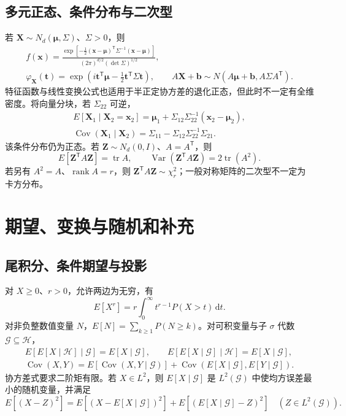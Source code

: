 \documentclass[../main.tex]{subfiles}
\begin{document}
\subsection{多元正态、条件分布与二次型}
若 $\bm X\sim N_d(\bm\mu,\Sigma)$、$\Sigma>0$，则
\begin{gather*}
f(\bm x)=\frac{\exp[-\tfrac12(\bm x-\bm\mu)^{\mathsf T}\Sigma^{-1}(\bm x-\bm\mu)]}
{(2\pi)^{d/2}(\det\Sigma)^{1/2}},\\
\varphi_{\bm X}(\bm t)=\exp(i\bm t^{\mathsf T}\bm\mu-\tfrac12\bm t^{\mathsf T}\Sigma\bm t),\qquad
A\bm X+\bm b\sim N(A\bm\mu+\bm b,A\Sigma A^{\mathsf T}).
\end{gather*}
特征函数与线性变换公式也适用于半正定协方差的退化正态，但此时不一定有全维密度。将向量分块，若 $\Sigma_{22}$ 可逆，
\begin{gather*}
E[\bm X_1\mid\bm X_2=\bm x_2]
=\bm\mu_1+\Sigma_{12}\Sigma_{22}^{-1}(\bm x_2-\bm\mu_2),\\
\operatorname{Cov}(\bm X_1\mid\bm X_2)
=\Sigma_{11}-\Sigma_{12}\Sigma_{22}^{-1}\Sigma_{21}.
\end{gather*}
该条件分布仍为正态。若 $\bm Z\sim N_d(0,I)$、$A=A^{\mathsf T}$，则
\[
E[\bm Z^{\mathsf T}A\bm Z]=\operatorname{tr}A,\qquad
\operatorname{Var}(\bm Z^{\mathsf T}A\bm Z)=2\operatorname{tr}(A^2).
\]
若另有 $A^2=A$、$\operatorname{rank}A=r$，则 $\bm Z^{\mathsf T}A\bm Z\sim\chi_r^2$；一般对称矩阵的二次型不一定为卡方分布。

\section{期望、变换与随机和补充}
\subsection{尾积分、条件期望与投影}
对 $X\ge0$、$r>0$，允许两边为无穷，有
\[
E[X^r]=r\int_0^\infty t^{r-1}P(X>t)\,\mathrm dt.
\]
对非负整数值变量 $N$，$E[N]=\sum_{k\ge1}P(N\ge k)$。对可积变量与子 $\sigma$ 代数 $\mathcal G\subseteq\mathcal H$，
\begin{gather*}
E[E[X\mid\mathcal H]\mid\mathcal G]=E[X\mid\mathcal G],\qquad
E[E[X\mid\mathcal G]\mid\mathcal H]=E[X\mid\mathcal G],\\
\operatorname{Cov}(X,Y)=E[\operatorname{Cov}(X,Y\mid\mathcal G)]
+\operatorname{Cov}(E[X\mid\mathcal G],E[Y\mid\mathcal G]).
\end{gather*}
协方差式要求二阶矩有限。若 $X\in L^2$，则 $E[X\mid\mathcal G]$ 是 $L^2(\mathcal G)$ 中使均方误差最小的随机变量，并满足
\[
E[(X-Z)^2]=E[(X-E[X\mid\mathcal G])^2]
+E[(E[X\mid\mathcal G]-Z)^2]\quad(Z\in L^2(\mathcal G)).
\]
\end{document}
